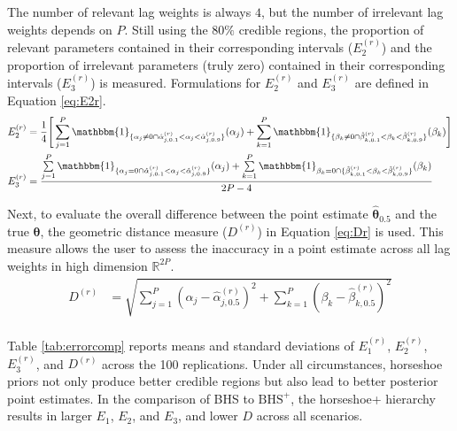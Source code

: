 The number of relevant lag weights is always $4$, but the number of irrelevant lag weights depends on $P$. Still using the $80\%$ credible regions, the proportion of relevant parameters contained in their corresponding intervals ($E_2^{(r)}$) and the proportion of irrelevant parameters (truly zero) contained in their corresponding intervals ($E_3^{(r)}$) is measured. Formulations for $E_2^{(r)}$ and $E_3^{(r)}$ are defined in Equation \ref{eq:E2r}. 
\begin{equation}
\label{eq:E2r}
	\begin{split}
	E^{(r)}_2&=\frac{1}{4}\Bigg[\sum\limits_{j=1}^P \mathbbm{1}_{\{\alpha_j\neq 0 \cap \hat{\alpha}^{(r)}_{j,0.1}<\alpha_j<\hat{\alpha}^{(r)}_{j,0.9}  \}} (\alpha_j) + \sum\limits_{k=1}^P \mathbbm{1}_{\{ \beta_k\neq 0 \cap \hat{\beta}^{(r)}_{k,0.1}<\beta_k<\hat{\beta}^{(r)}_{k,0.9}  \}} (\beta_k)\Bigg]\\
	E^{(r)}_3&=\frac{\sum\limits_{j=1}^P \mathbbm{1}_{\{\alpha_j= 0 \cap \hat{\alpha}^{(r)}_{j,0.1}<\alpha_j<\hat{\alpha}^{(r)}_{j,0.9}  \}} (\alpha_j) + \sum\limits_{k=1}^P \mathbbm{1}_{\beta_k= 0 \cap\{ \hat{\beta}^{(r)}_{k,0.1}<\beta_k<\hat{\beta}^{(r)}_{k,0.9}  \}} (\beta_k)}{2P-4}\\
	\end{split}
\end{equation}

Next, to evaluate the overall difference between the point estimate $\hat{\bm{\theta}}_{0.5}$ and the true $\bm{\theta}$, the geometric distance measure ($D^{(r)}$) in Equation \ref{eq:Dr} is used. This measure allows the user to assess the inaccuracy in a point estimate across all lag weights in high dimension $\mathbb{R}^{2P}$. 
\begin{equation}
\label{eq:Dr}
	\begin{split}
	D^{(r)}&=\sqrt{\sum\limits_{j=1}^P (\alpha_j-\hat{\alpha}^{(r)}_{j,0.5})^2+\sum\limits_{k=1}^P (\beta_k-\hat{\beta}^{(r)}_{k,0.5})^2}\\
	\end{split}
\end{equation}

Table \ref{tab:errorcomp} reports means and standard deviations of $E^{(r)}_1$, $E^{(r)}_2$, $E^{(r)}_3$, and $D^{(r)}$ across the 100 replications. Under all circumstances, horseshoe priors not only produce better credible regions but also lead to better posterior point estimates. In the comparison of BHS to $\textrm{BHS}^+$, the horseshoe+ hierarchy  results in larger $E_1$, $E_2$, and $E_3$, and lower $D$ across all scenarios. 

